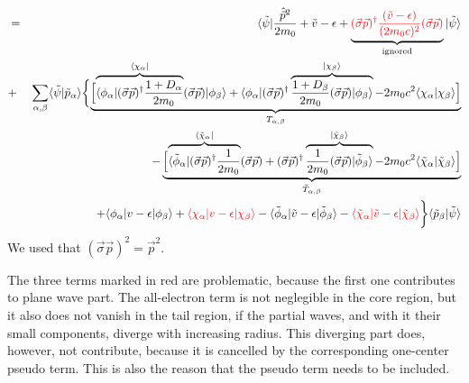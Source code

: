 \documentclass[11pt,a4paper]{report}
\begin{document}
\begin{eqnarray}
\nonumber\\  %
%
&=&\langle\tilde\psi|
\frac{\hat{\vec{p}}^2}{2m_0}+\tilde{v}-\epsilon
+
\underbrace{
\textcolor{red}{(\vec{\sigma}\vec{p})^\dagger
\frac{(\tilde{v}-\epsilon)}{(2m_0c)^2}(\vec{\sigma}\vec{p})}}_{\textrm{ignored}}
|\tilde{\psi}\rangle
\nonumber\\
&+&\sum_{\alpha,\beta}\langle\tilde{\psi}|\tilde{p}_\alpha\rangle
\biggl\lbrace
\underbrace{\Bigl[
\overbrace{
\langle\phi_\alpha|(\vec{\sigma}\vec{p})^\dagger
\frac{1+D_\alpha}{2m_0}
}^{\langle\chi_\alpha|}
(\vec{\sigma}\vec{p})|\phi_\beta\rangle
+\langle\phi_\alpha|
(\vec{\sigma}\vec{p})^\dagger
\overbrace{\frac{1+D_\beta}{2m_0}(\vec{\sigma}\vec{p})
|\phi_\beta\rangle}^{|\chi_\beta\rangle}
-2m_0c^2\langle\chi_\alpha|\chi_\beta\rangle\Bigr]}_{T_{\alpha,\beta}}
\nonumber\\
%
&&\hspace{1.5cm}
-\underbrace{\Bigl[
\overbrace{\langle\tilde{\phi}_\alpha|
(\vec{\sigma}\vec{p})^\dagger\frac{1}{2m_0}
}^{\langle\tilde{\chi}_\alpha|}(\vec{\sigma}\vec{p})
+(\vec{\sigma}\vec{p})^\dagger
\overbrace{
\frac{1}{2m_0}(\vec{\sigma}\vec{p})
|\tilde{\phi}_\beta\rangle}^{|\tilde{\chi}_\beta\rangle}
-2m_0c^2\langle\tilde{\chi}_\alpha
|\tilde{\chi}_\beta\rangle\Bigr]}_{\tilde{T}_{\alpha,\beta}}
\nonumber\\
&&\hspace{1.5cm}+\langle\phi_\alpha|v-\epsilon|\phi_\beta\rangle
+\textcolor{red}{\langle\chi_\alpha|v-\epsilon|\chi_\beta\rangle}
-\langle\tilde{\phi}_\alpha|
\tilde{v}-\epsilon|\tilde{\phi}_\beta\rangle
-
\textcolor{red}{
\langle\tilde{\chi}_\alpha|\tilde{v}-\epsilon|\tilde{\chi}_\beta\rangle}
\biggr\rbrace\langle
\tilde{p}_\beta|\tilde{\psi}\rangle
\nonumber\\
\end{eqnarray}
We used that $(\vec{\sigma}\vec{p})^2=\vec{p}^2$.

The three terms marked in red are problematic, because
the first one contributes to plane wave part. The all-electron term is
not neglegible in the core region, but it also does not vanish in the
tail region, if the partial waves, and with it their small components,
diverge with increasing radius. This diverging part does, however, not
contribute, because it is cancelled by the corresponding one-center
pseudo term. This is also the reason that the pseudo term needs to be
included.


\end{document}
